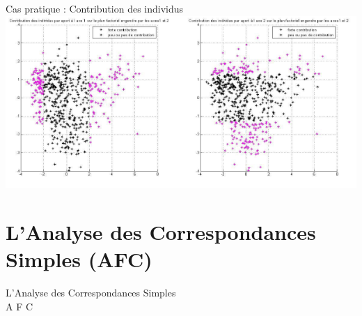 \documentclass[10pt]{beamer}
\begin{document}
\begin{frame}{ Cas pratique :  Contribution des individus}
\centering 
\includegraphics[scale=0.6]{CNL6} 

\end{frame}





\section{L'Analyse des Correspondances Simples (AFC)}
\begin{frame}
\centering
 \begin{Large}
 
 
L'Analyse des Correspondances Simples  \\



A F C
\end{Large}





\end{frame}



\end{document}
